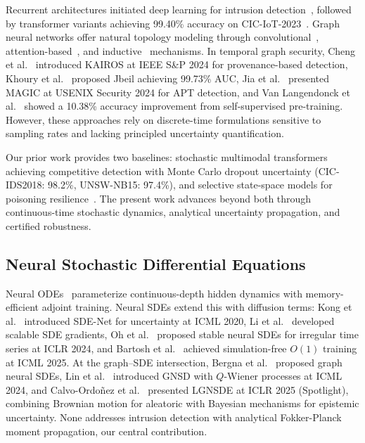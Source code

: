 \documentclass[journal]{IEEEtran}
\begin{document}
Recurrent architectures initiated deep learning for intrusion detection~\cite{kim2016lstm}, followed by transformer variants achieving 99.40\% accuracy on CIC-IoT-2023~\cite{he2024transformer}. Graph neural networks offer natural topology modeling through convolutional~\cite{kipf2017semi}, attention-based~\cite{velivckovic2018graph}, and inductive~\cite{hamilton2017inductive} mechanisms. In temporal graph security, Cheng et al.~\cite{cheng2024kairos} introduced KAIROS at IEEE S\&P 2024 for provenance-based detection, Khoury et al.~\cite{khoury2024jbeil} proposed Jbeil achieving 99.73\% AUC, Jia et al.~\cite{jia2024magic} presented MAGIC at USENIX Security 2024 for APT detection, and Van Langendonck et al.~\cite{vanlangendonck2024pptgnn} showed a 10.38\% accuracy improvement from self-supervised pre-training. However, these approaches rely on discrete-time formulations sensitive to sampling rates and lacking principled uncertainty quantification.

Our prior work provides two baselines: stochastic multimodal transformers~\cite{anaedevha2026stochastic} achieving competitive detection with Monte Carlo dropout uncertainty (CIC-IDS2018: 98.2\%, UNSW-NB15: 97.4\%), and selective state-space models for poisoning resilience~\cite{anaedevha2026mambashield}. The present work advances beyond both through continuous-time stochastic dynamics, analytical uncertainty propagation, and certified robustness.

\subsection{Neural Stochastic Differential Equations}

Neural ODEs~\cite{chen2018neural} parameterize continuous-depth hidden dynamics with memory-efficient adjoint training. Neural SDEs extend this with diffusion terms: Kong et al.~\cite{kong2020sdenet} introduced SDE-Net for uncertainty at ICML 2020, Li et al.~\cite{li2020scalable} developed scalable SDE gradients, Oh et al.~\cite{oh2024stable} proposed stable neural SDEs for irregular time series at ICLR 2024, and Bartosh et al.~\cite{bartosh2025simulation} achieved simulation-free $O(1)$ training at ICML 2025. At the graph--SDE intersection, Bergna et al.~\cite{bergna2023graph} proposed graph neural SDEs, Lin et al.~\cite{lin2024gnsd} introduced GNSD with $Q$-Wiener processes at ICML 2024, and Calvo-Ordo\~{n}ez et al.~\cite{calvo2025lgnsde} presented LGNSDE at ICLR 2025 (Spotlight), combining Brownian motion for aleatoric with Bayesian mechanisms for epistemic uncertainty. None addresses intrusion detection with analytical Fokker-Planck moment propagation, our central contribution.
\end{document}
